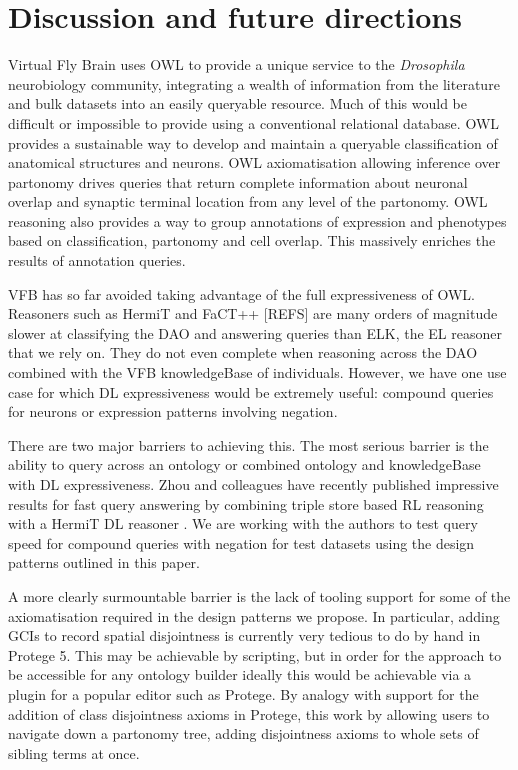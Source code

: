 \documentclass[runningheads,a4paper]{llncs}
\begin{document}
\section{Discussion and future directions}


Virtual Fly Brain uses OWL to provide a unique service to the
\textit{Drosophila} neurobiology community, integrating a wealth of
information from the literature and bulk datasets into an easily
queryable resource.  Much of this would be difficult or impossible to
provide using a conventional relational database. OWL
provides a sustainable way to develop and maintain a queryable
classification of anatomical structures and neurons.  OWL
axiomatisation allowing inference over partonomy drives queries that
 return complete information about neuronal overlap and synaptic
 terminal location from any level of the partonomy.  OWL reasoning
 also provides a way to group annotations of expression and phenotypes
 based on classification, partonomy and cell overlap.  This massively
 enriches the results of annotation queries.


VFB has so far avoided taking advantage of the full expressiveness of
OWL.  Reasoners such as HermiT and FaCT++ [REFS] are many orders of
magnitude slower at classifying the DAO and answering queries than
ELK, the EL reasoner that we rely on.  They do not even complete when
reasoning across the DAO combined with the VFB knowledgeBase of
individuals.  However, we have one use case for which DL
expressiveness would be extremely useful: compound queries for neurons
or expression patterns involving negation.

There are two major barriers to achieving this. The most serious
barrier is the ability to query across an ontology or combined ontology and
knowledgeBase with DL expressiveness.  Zhou and colleagues have
recently published impressive results for fast query answering by
combining triple store based RL reasoning with a HermiT DL reasoner
\cite{ZNCH14a}.  We are working with the authors to test query speed
for compound queries with negation for test datasets using the design
patterns outlined in this paper.

A more clearly surmountable barrier is the lack of tooling support for
some of the axiomatisation required in the design patterns we propose.  In
particular, adding GCIs to record spatial disjointness is currently
very tedious to do by hand in Protege 5.  This may be achievable by
scripting, but in order for the approach to be accessible for any
ontology builder ideally this would be achievable via a plugin for a
popular editor such as Protege.  By analogy with support for the
addition of class disjointness axioms in Protege, this work by allowing
users to navigate down a partonomy tree, adding disjointness axioms to
whole sets of sibling terms at once.
\end{document}
